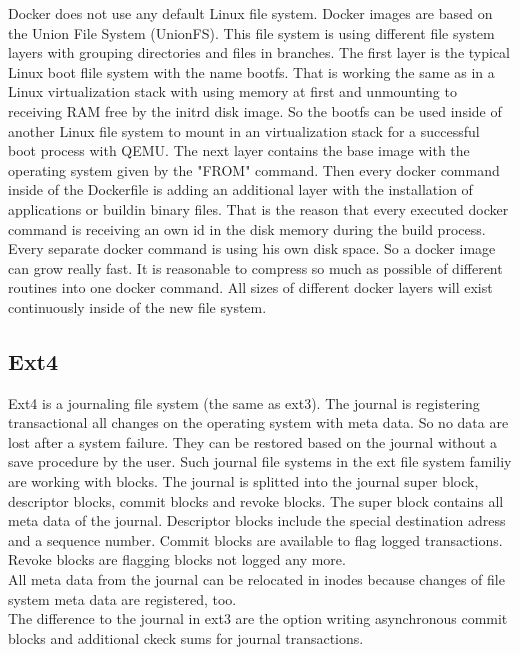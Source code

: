 Docker does not use any default Linux file system. 
Docker images are based on the Union File System (UnionFS)\cite[~p.21]{Ashraf2015}. 
This file system is using different file system layers with grouping directories and files in branches. 
The first layer is the typical Linux boot flile system with the name bootfs. 
That is working the same as in a Linux virtualization stack with using memory at first and unmounting to receiving RAM free by the initrd disk image. 
So the bootfs can be used inside of another Linux file system to mount in an virtualization stack for a successful boot process with QEMU.
The next layer contains the base image with the operating system given by the "FROM" command.
Then every docker command inside of the Dockerfile is adding an additional layer with the installation of applications or buildin binary files.
That is the reason that every executed docker command is receiving an own id in the disk memory during the build process.
Every separate docker command is using his own disk space. So a docker image can grow really fast.
It is reasonable to compress so much as possible of different routines into one docker command. 
All sizes of different docker layers will exist continuously inside of the new file system.

\subsection{Ext4}

Ext4 is a journaling file system (the same as ext3). The journal is registering transactional all changes on the operating system with meta data.
So no data  are lost after a system failure. They can be restored based on the journal without a save procedure by the user.
Such journal file systems in the ext file system familiy are working with blocks\cite[~p.20]{Seufert2015}.
The journal is splitted into the journal super block, descriptor blocks, commit blocks and revoke blocks.
The super block contains all meta data of the journal. Descriptor blocks include the special destination adress and a sequence number. 
Commit blocks are available to flag logged transactions.
Revoke blocks are flagging blocks not logged any more. \\
All meta data from the journal can be relocated in inodes because changes of file system meta data are registered, too. \\
The difference to the journal in ext3 are the option writing asynchronous commit blocks and additional ckeck sums for journal transactions\cite[p.28]{Seufert2015}.

